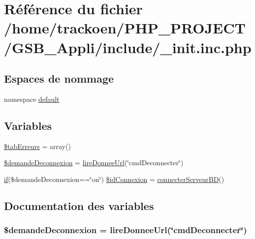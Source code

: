 \hypertarget{__init_8inc_8php}{\section{Référence du fichier /home/trackoen/\-P\-H\-P\-\_\-\-P\-R\-O\-J\-E\-C\-T/\-G\-S\-B\-\_\-\-Appli/include/\-\_\-init.inc.\-php}
\label{__init_8inc_8php}
}
\subsection*{Espaces de nommage}
\begin{DoxyCompactItemize}
\item 
namespace \hyperlink{namespacedefault}{default}
\end{DoxyCompactItemize}
\subsection*{Variables}
\begin{DoxyCompactItemize}
\item 
\hyperlink{__init_8inc_8php_aaab0cf947dbef94de72bc55c49555684}{\$tab\-Erreurs} = array()
\item 
\hyperlink{__init_8inc_8php_a66aed633c4b3dc9690db4076a0a7edf5}{\$demande\-Deconnexion} = \hyperlink{__utilitaires_et_gestion_erreurs_8lib_8php_ad3618b973b51810a2eb97a0493ade9ee}{lire\-Donnee\-Url}(\char`\"{}cmd\-Deconnecter\char`\"{})
\item 
\hyperlink{c_se_connecter_8php_a161e098d41499c163a94c3fa5cd0e698}{if}(\$demande\-Deconnexion==\char`\"{}on\char`\"{}) \hyperlink{__init_8inc_8php_ae48ae6a6b06018043563b88782bd2bee}{\$id\-Connexion} = \hyperlink{__bd_gestion_donnees_8lib_8php_a3e03d598e990acf42577600cfe37f114}{connecter\-Serveur\-B\-D}()
\end{DoxyCompactItemize}


\subsection{Documentation des variables}
\hypertarget{__init_8inc_8php_a66aed633c4b3dc9690db4076a0a7edf5}{
\subsubsection[{\$demande\-Deconnexion}]{\setlength{\rightskip}{0pt plus 5cm}\$demande\-Deconnexion = {\bf lire\-Donnee\-Url}(\char`\"{}cmd\-Deconnecter\char`\"{})}}\label{__init_8inc_8php_a66aed633c4b3dc9690db4076a0a7edf5}


